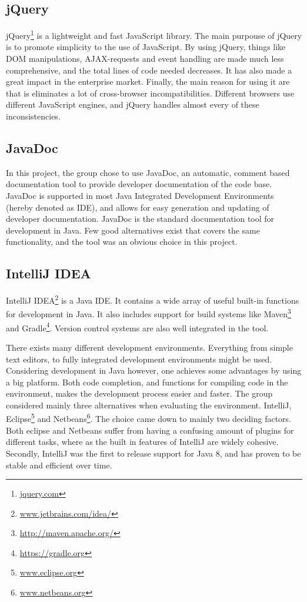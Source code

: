 \subsection{jQuery}
\label{subsec:prestudies-tools-jQuery}

jQuery\footnote{\url{jquery.com}} is a lightweight and fast JavaScript library. The main purpouse of jQuery is to promote simplicity to the use of JavaScript. By using jQuery, things like DOM manipulations, AJAX-requests and event handling are made much less comprehensive, and the total lines of code needed decreases. It has also made a great impact in the enterprise market. Finally, the main reason for using it are that is eliminates a lot of cross-browser incompatibilities. Different browsers use different JavaScript engines, and jQuery handles almost every of these inconsistencies.

\subsection{JavaDoc}
\label{subsec:prestudies-tools-javadoc}

In this project, the group chose to use JavaDoc, an automatic, comment based documentation tool to provide developer documentation of the code base. JavaDoc is supported in most Java Integrated Development Environments (hereby denoted as IDE), and allows for easy generation and updating of developer documentation. JavaDoc is the standard documentation tool for development in Java. Few good alternatives exist that covers the same functionality, and the tool was an obvious choice in this project.

\subsection{IntelliJ IDEA}
\label{subsec:prestudies-tools-intellij_idea}

IntelliJ IDEA\footnote{\url{www.jetbrains.com/idea/}} is a Java IDE. It contains a wide array of useful built-in functions for development in Java. It also includes support for build systems like Maven\footnote{\url{http://maven.apache.org/}} and Gradle\footnote{\url{https://gradle.org}}. Version control systems are also well integrated in the tool.

There exists many different development environments. Everything from simple text editors, to fully integrated development environments might be used. Considering development in Java however, one achieves some advantages by using a big platform. Both code completion, and functions for compiling code in the environment, makes the development process easier and faster. The group considered mainly three alternatives when evaluating the environment. IntelliJ, Eclipse\footnote{\url{www.eclipse.org}} and Netbeans\footnote{\url{www.netbeans.org}}. The choice came down to mainly two deciding factors. Both eclipse and Netbeans suffer from having a confusing amount of plugins for different tasks, where as the built in features of IntelliJ are widely cohesive. Secondly, IntelliJ was the first to release support for Java 8, and has proven to be stable and efficient over time.

